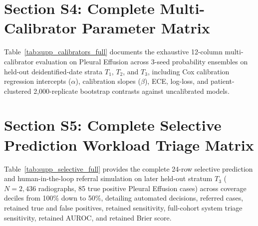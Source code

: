 \documentclass[preprint,12pt]{elsarticle}
\begin{document}
\section*{Section S4: Complete Multi-Calibrator Parameter Matrix}
Table~\ref{tab:supp_calibrators_full} documents the exhaustive 12-column multi-calibrator evaluation on Pleural Effusion across 3-seed probability ensembles on held-out deidentified-date strata $T_1$, $T_2$, and $T_3$, including Cox calibration regression intercepts ($\alpha$), calibration slopes ($\beta$), ECE, log-loss, and patient-clustered 2,000-replicate bootstrap contrasts against uncalibrated models.

\begin{table}[!htbp]
\caption{Supplementary Table S4: Complete 12-Column Multi-Calibrator Comparison on Pleural Effusion across 3-Seed Probability Ensembles, Evaluating Cox Intercept ($\alpha$), Slope ($\beta$), ECE, Log-Loss, and Paired Bootstrap Contrasts.}
\label{tab:supp_calibrators_full}
\centering
\resizebox{\textwidth}{!}{%

}
\end{table}

\section*{Section S5: Complete Selective Prediction Workload Triage Matrix}
Table~\ref{tab:supp_selective_full} provides the complete 24-row selective prediction and human-in-the-loop referral simulation on later held-out stratum $T_3$ ($N = 2,436$ radiographs, 85 true positive Pleural Effusion cases) across coverage deciles from 100\% down to 50\%, detailing automated decisions, referred cases, retained true and false positives, retained sensitivity, full-cohort system triage sensitivity, retained AUROC, and retained Brier score.

\begin{table}[!htbp]
\caption{Supplementary Table S5: Complete 24-Row Selective Prediction and Reader Referral Triage Simulation on Later Held-Out Stratum $T_3$ ($N = 2,436$ Radiographs, 85 Positive Pleural Effusion Cases) across All Coverage Regimes (100\% to 50\%).}
\label{tab:supp_selective_full}
\centering
\resizebox{\textwidth}{!}{%

}
\end{table}
\end{document}
